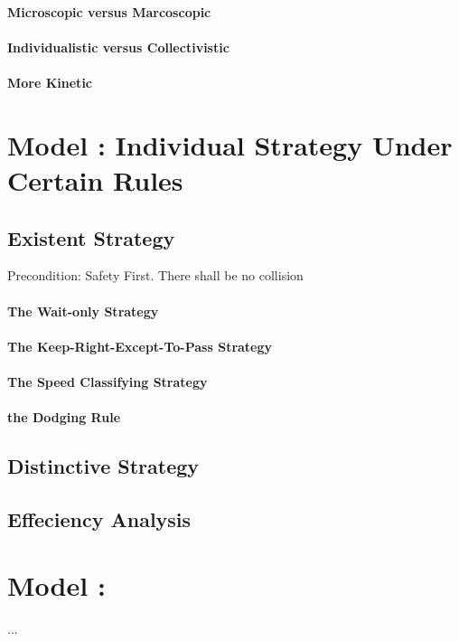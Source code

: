 \paragraph{Microscopic versus Marcoscopic}
\paragraph{Individualistic versus Collectivistic}
\paragraph{More Kinetic}

\section{Model \uppercase\expandafter{}: Individual Strategy Under Certain Rules}
\subsection{Existent Strategy}
Precondition: Safety First. There shall be no collision
\paragraph{The Wait-only Strategy}
\paragraph{The Keep-Right-Except-To-Pass Strategy}
\paragraph{The Speed Classifying Strategy}
\paragraph{the Dodging Rule}
\subsection{Distinctive Strategy}

\subsection{Effeciency Analysis}

\section{Model \uppercase\expandafter{}: }
... 


